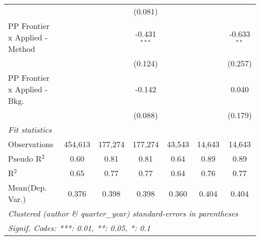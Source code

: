 \begin{tabular}{lcccccc}
                                  &                &                & (0.081)        &                &              &   \\   
   PP Frontier x Applied - Method &                &                & -0.431$^{***}$ &                &              & -0.633$^{**}$\\   
                                  &                &                & (0.124)        &                &              & (0.257)\\   
   PP Frontier x Applied - Bkg.   &                &                & -0.142         &                &              & 0.040\\   
                                  &                &                & (0.088)        &                &              & (0.179)\\   
   \midrule
   \emph{Fit statistics}\\
   Observations                   & 454,613        & 177,274        & 177,274        & 43,543         & 14,643       & 14,643\\  
   Pseudo R$^2$                   & 0.60           & 0.81           & 0.81           & 0.64           & 0.89         & 0.89\\  
   R$^2$                          & 0.65           & 0.77           & 0.77           & 0.64           & 0.76         & 0.77\\  
Mean(Dep. Var.) & 0.376 & 0.398 & 0.398 & 0.360 & 0.404 & 0.404 \\
   \midrule \midrule
   \multicolumn{7}{l}{\emph{Clustered (author \& quarter\_year) standard-errors in parentheses}}\\
   \multicolumn{7}{l}{\emph{Signif. Codes: ***: 0.01, **: 0.05, *: 0.1}}\\
\end{tabular}
\par\endgroup

